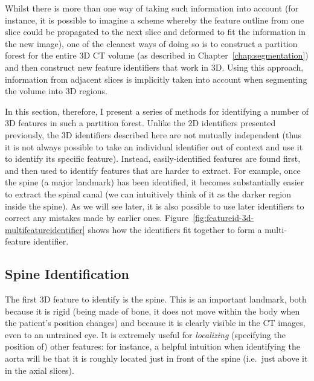 
Whilst there is more than one way of taking such information into account (for instance, it is possible to imagine a scheme whereby the feature outline from one slice could be propagated to the next slice and deformed to fit the information in the new image), one of the cleanest ways of doing so is to construct a partition forest for the entire 3D CT volume (as described in Chapter~\ref{chap:segmentation}) and then construct new feature identifiers that work in 3D. Using this approach, information from adjacent slices is implicitly taken into account when segmenting the volume into 3D regions.

In this section, therefore, I present a series of methods for identifying a number of 3D features in such a partition forest. Unlike the 2D identifiers presented previously, the 3D identifiers described here are not mutually independent (thus it is not always possible to take an individual identifier out of context and use it to identify its specific feature). Instead, easily-identified features are found first, and then used to identify features that are harder to extract. For example, once the spine (a major landmark) has been identified, it becomes substantially easier to extract the spinal canal (we can intuitively think of it as the darker region inside the spine). As we will see later, it is also possible to use later identifiers to correct any mistakes made by earlier ones. Figure~\ref{fig:featureid-3d-multifeatureidentifier} shows how the identifiers fit together to form a multi-feature identifier.

\subsection{Spine Identification}


The first 3D feature to identify is the spine. This is an important landmark, both because it is rigid (being made of bone, it does not move within the body when the patient's position changes) and because it is clearly visible in the CT images, even to an untrained eye. It is extremely useful for \emph{localizing} (specifying the position of) other features: for instance, a helpful intuition when identifying the aorta will be that it is roughly located just in front of the spine (i.e.~just above it in the axial slices).

